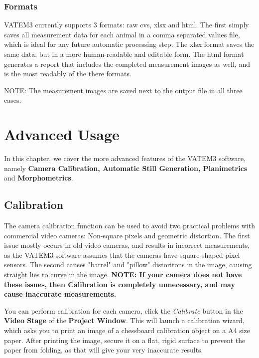 \documentclass[10pt,a4paper,oneside]{report}             %
\newcommand*{\img}[1]{%
	\raisebox{-.02\baselineskip}{%
		\texttt{[image: \#1]}%
	}%
}
\begin{document}
\subsection{Formats}

VATEM3 currently supports 3 formats: raw cvs, xlsx and html. The first simply saves all measurement data for each animal in a comma separated values file, which is ideal for any future automatic processing step. The xlsx format saves the same data, but in a more human-readable and editable form. The html format generates a report that includes the completed measurement images as well, and is the most readably of the there formats. 

NOTE: The measurement images are saved next to the output file in all three cases.


\chapter{Advanced Usage}

In this chapter, we cover the more advanced features of the VATEM3 software, namely \textbf{Camera Calibration, Automatic Still Generation, Planimetrics} and \textbf{Morphometrics}.

\section{Calibration}

The camera calibration function can be used to avoid two practical problems with commercial video cameras: Non-square pixels and geometric distortion. The first issue mostly occurs in old video cameras, and results in incorrect measurements, as the VATEM3 software assumes that the cameras have square-shaped pixel sensors. The second causes "barrel" and "pillow" distoritons in the image, causing straight lies to curve in the image. \textbf{NOTE: If your camera does not have these issues, then Calibration is completely unnecessary, and may cause inaccurate measurements.}

You can perform calibration for each camera, click the \textit{Calibrate} \img{../VAM/Icons/1462455465_centimeter.png} button in the \textbf{Video Stage} of the \textbf{Project Window}. This will launch a calibration wizard, which asks you to print an image of a chessboard calibration object on a A4 size paper. After printing the image, secure it on a flat, rigid surface to prevent the paper from folding, as that will give your very inaccurate results.
\end{document}
